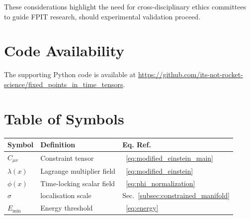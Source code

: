 \documentclass[twocolumn]{article}
\begin{document}
	These considerations highlight the need for cross-disciplinary ethics committees to guide FPIT research, should experimental validation proceed.
	
	\FloatBarrier%
	\section{Code Availability}\label{app:python}
	The supporting Python code is available at \url{https://github.com/its-not-rocket-science/fixed_points_in_time_tensors}.
	
	\FloatBarrier%
	\section{Table of Symbols}\label{app:symbols}
	
	\begin{tabular}{@{}lll@{}}
		\toprule  
		\textbf{Symbol} & \textbf{Definition} & \textbf{Eq. Ref.} \\  
		\midrule  
		$C_{\mu\nu}$ & Constraint tensor &~\eqref{eq:modified_einstein_main} \\  
		$\lambda(x)$ & Lagrange multiplier field &~\eqref{eq:modified_einstein} \\  
		$\phi(x)$ & Time-locking scalar field &~\eqref{eq:phi_normalization} \\  
		$\sigma$ & localisation scale & Sec.~\ref{subsec:constrained_manifold} \\  
		$E_{\text{min}}$ & Energy threshold &~\eqref{eq:energy} \\  
		\bottomrule  
	\end{tabular} 
	
	
	
\end{document}
